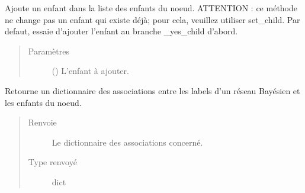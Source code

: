 \documentclass[letterpaper,10pt,french]{sphinxmanual}
\begin{document}
\begin{fulllineitems}
\begin{fulllineitems}
\begin{quote}
\begin{description}
\end{description}\end{quote}

\end{fulllineitems}


\begin{fulllineitems}
\label{\detokenize{index:StrategyTree.Observation.add_child}}
Ajoute un enfant dans la liste des enfants du noeud.
ATTENTION : ce méthode ne change pas un enfant qui existe déjà; pour
cela, veuillez utiliser set\_child. Par defaut, essaie d’ajouter
l’enfant au branche \_yes\_child d’abord.
\begin{quote}\begin{description}
\item[{Paramètres}] \leavevmode
{} ({\hyperref[\detokenize{index:StrategyTree.NodeST}]{}}) \textendash{} L’enfant à ajouter.

\end{description}\end{quote}

\end{fulllineitems}


\begin{fulllineitems}
\label{\detokenize{index:StrategyTree.Observation.bn_labels_children_association}}
Retourne un dictionnaire des associations entre les labels d’un réseau
Bayésien et les enfants du noeud.
\begin{quote}\begin{description}
\item[{Renvoie}] \leavevmode
{} \textendash{} Le dictionnaire des associations concerné.

\item[{Type renvoyé}] \leavevmode
dict

\end{description}\end{quote}


\end{fulllineitems}
\end{fulllineitems}
\end{document}
